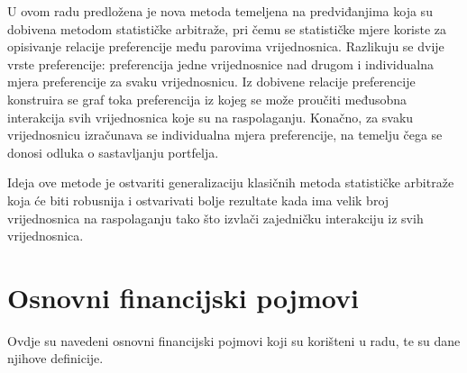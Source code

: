 \documentclass[lmodern, utf8, diplomski, numeric]{fer}
\begin{document}
  U ovom radu predložena je nova metoda temeljena na predviđanjima koja su dobivena metodom statističke arbitraže, pri čemu se statističke mjere koriste za opisivanje relacije preferencije među parovima vrijednosnica.
  Razlikuju se dvije vrste preferencije: preferencija jedne vrijednosnice nad drugom i individualna mjera preferencije za svaku vrijednosnicu.
  Iz dobivene relacije preferencije konstruira se graf toka preferencija iz kojeg se može proučiti međusobna interakcija svih vrijednosnica koje su na raspolaganju.
  Konačno, za svaku vrijednosnicu izračunava se individualna mjera preferencije, na temelju čega se donosi odluka o sastavljanju portfelja.
  
  Ideja ove metode je ostvariti generalizaciju klasičnih metoda statističke arbitraže koja će biti robusnija i ostvarivati bolje rezultate kada ima velik broj vrijednosnica na raspolaganju tako što izvlači zajedničku interakciju iz svih vrijednosnica.
  

  \chapter{Osnovni financijski pojmovi}
  Ovdje su navedeni osnovni financijski pojmovi koji su korišteni u radu, te su dane njihove definicije.
  
\end{document}
